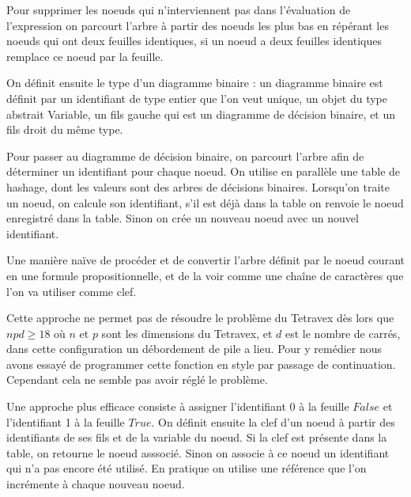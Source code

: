 \documentclass[11pt]{article}
\begin{document}
Pour supprimer les noeuds qui n'interviennent pas dans l'évaluation de l'expression on parcourt l'arbre à partir des noeuds les plus bas en répérant les noeuds qui ont deux feuilles identiques, si un noeud a deux feuilles identiques remplace ce noeud par la feuille.

On définit ensuite le type d'un diagramme binaire : un diagramme binaire est définit par un identifiant de type entier que l'on veut unique, un objet du type abstrait Variable, un fils gauche qui est un diagramme de décision binaire, et un fils droit du même type.  

Pour passer au diagramme de décision binaire, on parcourt l'arbre afin de déterminer un identifiant pour chaque noeud. On utilise en parallèle une table de hashage, dont les valeurs sont des arbres de décisions binaires. Lorsqu'on traite un noeud, on calcule son identifiant, s'il est déjà dans la table on renvoie le noeud enregistré dans la table. Sinon on crée un nouveau noeud avec un nouvel identifiant.

Une manière naïve de procéder et de convertir l'arbre définit par le noeud courant en une formule propositionnelle, et de la voir comme une chaîne de caractères que l'on va utiliser comme clef.

Cette approche ne permet pas de résoudre le problème du Tetravex dès lors que $npd \geq 18$ où $n$ et $p$ sont les dimensions du Tetravex, et $d$ est le nombre de carrés, dans cette configuration un débordement de pile a lieu. Pour y remédier nous avons essayé de programmer cette fonction en style par passage de continuation. Cependant cela ne semble pas avoir réglé le problème.	 

Une approche plus efficace consiste à assigner l'identifiant $0$ à la feuille $False$ et l'identifiant 1 à la feuille $True$. On définit ensuite la clef d'un noeud à partir des identifiants de ses fils et de la variable du noeud. Si la clef est présente dans la table, on retourne le noeud asssocié. Sinon on associe à ce noeud un identifiant qui n'a pas encore été utilisé. En pratique on utilise une référence que l'on incrémente à chaque nouveau noeud.
\end{document}
